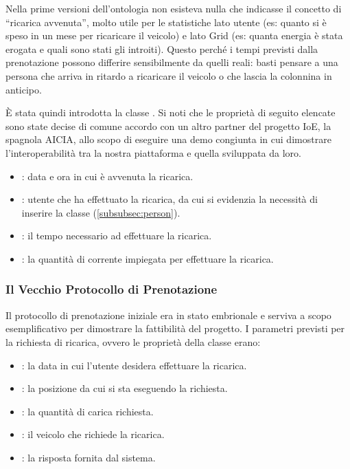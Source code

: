 Nella prime versioni dell'ontologia non esisteva nulla che indicasse il concetto di ``ricarica avvenuta'', molto utile per le statistiche lato utente (es: quanto si è speso in un mese per ricaricare il veicolo) e lato Grid (es: quanta energia è stata erogata e quali sono stati gli introiti). Questo perché i tempi previsti dalla prenotazione possono differire sensibilmente da quelli reali: basti pensare a una persona che arriva in ritardo a ricaricare il veicolo o che lascia la colonnina in anticipo. 

È stata quindi introdotta la classe . Si noti che le proprietà di seguito elencate sono state decise di comune accordo con un altro partner del progetto IoE, la spagnola AICIA, allo scopo di eseguire una demo congiunta in cui dimostrare l'interoperabilità tra la nostra piattaforma e quella sviluppata da loro.

\begin{itemize}
	\item {}: data e ora in cui è avvenuta la ricarica.
	\item {}: utente che ha effettuato la ricarica, da cui si evidenzia la necessità di inserire la classe  (\ref{subsubsec:person}).
	\item {}: il tempo necessario ad effettuare la ricarica.
	\item {}: la quantità di corrente impiegata per effettuare la ricarica.
\end{itemize}

\subsubsection{Il Vecchio Protocollo di Prenotazione}\label{subsubsec:old-proto}

Il protocollo di prenotazione iniziale era in stato embrionale e serviva a scopo esemplificativo per dimostrare la fattibilità del progetto. I parametri previsti per la richiesta di ricarica, ovvero le proprietà della classe  erano:

\begin{itemize}
	\item {}: la data in cui l'utente desidera effettuare la ricarica.
	\item {}: la posizione da cui si sta eseguendo la richiesta.
	\item {}: la quantità di carica richiesta. 
	\item {}: il veicolo che richiede la ricarica.
	\item {}: la risposta fornita dal sistema.
\end{itemize}

